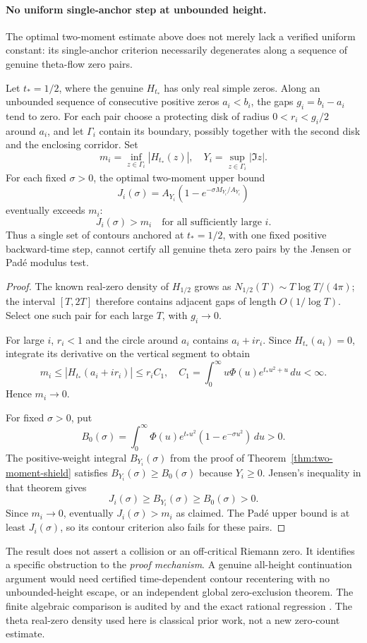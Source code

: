 \paragraph{No uniform single-anchor step at unbounded height.}
The optimal two-moment estimate above does not merely
lack a verified uniform constant: its single-anchor
criterion necessarily degenerates along a sequence
of genuine theta-flow zero pairs.

\begin{proposition}
\label{prop:single-anchor-degeneration}
Let $t_*=1/2$, where the genuine
$H_{t_*}$ has only real simple zeros.
Along an unbounded sequence of consecutive
positive zeros $a_i<b_i$, the gaps
$g_i=b_i-a_i$ tend to zero.
For each pair choose a protecting disk of
radius $0<r_i<g_i/2$ around $a_i$, and
let $\Gamma_i$ contain its boundary,
possibly together with the second disk
and the enclosing corridor.
Set
\[
m_i=\inf_{z\in\Gamma_i}|H_{t_*}(z)|,\quad
Y_i=\sup_{z\in\Gamma_i}|\Im z|.
\]
For each fixed $\sigma>0$, the optimal
two-moment upper bound
\[
J_i(\sigma)=A_{Y_i}
(1-e^{-\sigma M_{Y_i}/A_{Y_i}})
\]
eventually exceeds $m_i$:
\[
\boxed{J_i(\sigma)>m_i
\quad\text{for all sufficiently large }i.}
\]
Thus a single set of contours anchored at
$t_*=1/2$, with one fixed positive
backward-time step, cannot certify all
genuine theta zero pairs by the Jensen
or Pad\'e modulus test.
\end{proposition}
\begin{proof}
The known real-zero density of $H_{1/2}$
grows as $N_{1/2}(T)\sim
T\log T/(4\pi)$; the interval $[T,2T]$
therefore contains adjacent gaps
of length $O(1/\log T)$. Select one
such pair for each large $T$,
with $g_i\to0$.

For large $i$, $r_i<1$ and the
circle around $a_i$ contains
$a_i+i r_i$. Since $H_{t_*}(a_i)=0$,
integrate its derivative on the
vertical segment to obtain
\[
m_i\le|H_{t_*}(a_i+i r_i)|
\le r_i C_1,\quad
C_1=\int_0^\infty
u\Phi(u)e^{t_*u^2+u}\,du<\infty.
\]
Hence $m_i\to0$.

For fixed $\sigma>0$, put
\[
B_0(\sigma)=\int_0^\infty
\Phi(u)e^{t_*u^2}
(1-e^{-\sigma u^2})\,du>0.
\]
The positive-weight integral
$B_{Y_i}(\sigma)$ from the proof
of Theorem~\ref{thm:two-moment-shield}
satisfies $B_{Y_i}(\sigma)\ge B_0(\sigma)$
because $Y_i\ge0$.
Jensen's inequality in that theorem
gives
\[
J_i(\sigma)\ge B_{Y_i}(\sigma)
\ge B_0(\sigma)>0.
\]
Since $m_i\to0$, eventually
$J_i(\sigma)>m_i$ as claimed.
The Pad\'e upper bound is at least
$J_i(\sigma)$, so its contour
criterion also fails for these pairs.
\end{proof}

The result does not assert a collision or
an off-critical Riemann zero.
It identifies a specific obstruction
to the \emph{proof mechanism}.
A genuine all-height continuation argument
would need certified time-dependent contour
recentering with no unbounded-height escape,
or an independent global zero-exclusion theorem.
The finite algebraic comparison is audited by
and the exact rational regression
.
The theta real-zero density used here is
classical prior work, not a new zero-count
estimate.
